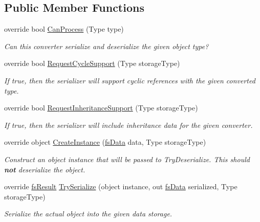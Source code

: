 \subsection*{Public Member Functions}
\begin{DoxyCompactItemize}
\item 
override bool \hyperlink{class_full_serializer_1_1_internal_1_1fs_enum_converter_a93dc5222263e0354440a14a8dac74128}{Can\+Process} (Type type)
\begin{DoxyCompactList}\small\item\em Can this converter serialize and deserialize the given object type? \end{DoxyCompactList}\item 
override bool \hyperlink{class_full_serializer_1_1_internal_1_1fs_enum_converter_a9f297d3fbac4eecd05de362227a1161e}{Request\+Cycle\+Support} (Type storage\+Type)
\begin{DoxyCompactList}\small\item\em If true, then the serializer will support cyclic references with the given converted type. \end{DoxyCompactList}\item 
override bool \hyperlink{class_full_serializer_1_1_internal_1_1fs_enum_converter_a4af727f1cb13c61c7e5f57bb6c3e682b}{Request\+Inheritance\+Support} (Type storage\+Type)
\begin{DoxyCompactList}\small\item\em If true, then the serializer will include inheritance data for the given converter. \end{DoxyCompactList}\item 
override object \hyperlink{class_full_serializer_1_1_internal_1_1fs_enum_converter_a1d20e736fc995f6d127a312ae19f55b2}{Create\+Instance} (\hyperlink{class_full_serializer_1_1fs_data}{fs\+Data} data, Type storage\+Type)
\begin{DoxyCompactList}\small\item\em Construct an object instance that will be passed to Try\+Deserialize. This should {\bfseries not} deserialize the object. \end{DoxyCompactList}\item 
override \hyperlink{struct_full_serializer_1_1fs_result}{fs\+Result} \hyperlink{class_full_serializer_1_1_internal_1_1fs_enum_converter_a6072af5ab89cf19592d346e37b09b140}{Try\+Serialize} (object instance, out \hyperlink{class_full_serializer_1_1fs_data}{fs\+Data} serialized, Type storage\+Type)
\begin{DoxyCompactList}\small\item\em Serialize the actual object into the given data storage. \end{DoxyCompactList}\item 

\end{DoxyCompactItemize}
